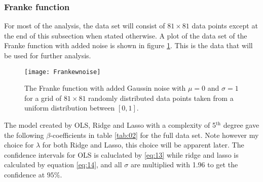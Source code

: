 \documentclass[uio,jmp,amsmath,amssymb,reprint,nofootinbib]{revtex4-1}
\numberwithin{equation}{section}
\begin{document}
\subsubsection{Franke function}

For most of the analysis, the data set will consist of \(81\times 81\) data points except at the end of this subsection when stated otherwise. A plot of the data set of the Franke function with added noise is shown in figure \ref{fig:Franke_w_noise}. This is the data that will be used for further analysis.

\begin{figure}[H]
    \centering
    \texttt{[image: Frankewnoise]}
    \caption{The Franke function with added Gaussin noise with \(\mu=0\) and \(\sigma=1\) for a grid of \(81\times 81\) randomly distributed data points taken from a uniform distribution between \([0,1]\).}
    \label{fig:Franke_w_noise}
\end{figure}

The model created by OLS, Ridge and Lasso with a complexity of 5\(^\text{th}\) degree gave the following \(\beta\)-coefficients in table \ref{tab:02} for the full data set. Note however my choice for \(\lambda\) for both Ridge and Lasso, this choice will be apparent later. The confidence intervals for OLS is caluclated by \ref{eq:13} while ridge and lasso is calculated by equation \ref{eq:14}, and all \(\sigma\) are multiplied with 1.96 to get the confidence at \(95\%\).
\end{document}
